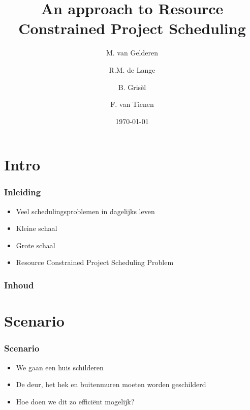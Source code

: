 \documentclass{beamer}
\title[RCPSP]{An approach to Resource Constrained Project Scheduling}
\author{M. van Gelderen  \and
    R.M. de Lange \and
    B. Gris\`el \and
    F. van Tienen}
\institute{TU Delft}
\date{\today}
\theoremstyle{definition}
\begin{document}
\begin{frame}
\titlepage
\end{frame}

\section*{Intro}
\begin{frame}
  \frametitle{Inleiding}
  \begin{itemize}
		\item Veel schedulingsproblemen in dagelijks leven
		\item Kleine schaal
		\item Grote schaal
		\item Resource Constrained Project Scheduling Problem
  \end{itemize}
\end{frame}

\begin{frame}
    \frametitle{Inhoud}
    \tableofcontents
\end{frame}


\section{Scenario}

\begin{frame}
    \frametitle{Scenario}
    \begin{itemize}
    	\item We gaan een huis schilderen
    	\item De deur, het hek en buitenmuren moeten worden geschilderd
    	\item Hoe doen we dit zo effici\"{e}nt mogelijk?
    \end{itemize}
\end{frame}
\end{document}
